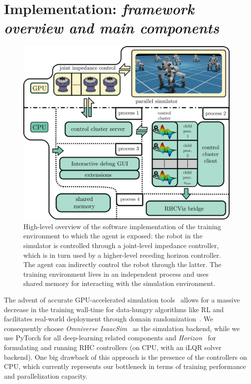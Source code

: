 \section{Implementation: \textnormal{\textit{framework overview and main components}}}
\begin{figure}[t]
	\centering
	\includegraphics[width=0.9\columnwidth]{imgs/cocluster_arch.pdf}
	\caption{High-level overview of the software implementation of the training environment to which the agent is exposed: the robot in the simulator is controlled through a joint-level impedance controller, which is in turn used by a higher-level receding horizon controller. The agent can indirectly control the robot through the latter. The training environment lives in an independent process and uses shared memory for interacting with the simulation environment.}
	\label{fig:coclbridge_arch}
\end{figure}
The advent of accurate GPU-accelerated simulation tools~\cite{web::isaacsim,rl:mujocoaccelereted2023} allows for a massive decrease in the training wall-time for data-hungry algorithms like RL and facilitates real-world deployment through domain randomization~\cite{rl:rudin2022learning,rl:rudin2022advanced}. We consequently choose \textit{Omniverse IsaacSim}~\cite{web::isaacsim} as the simulation backend, while we use PyTorch for all deep-learning related components and  \textit{Horizon}~\cite{frameworks::horizon_to} for formulating and running RHC controllers (on CPU, with an iLQR solver backend). One big drawback of this approach is the presence of the controllers on CPU, which currently represents our bottleneck in terms of training performance and parallelization capacity.
